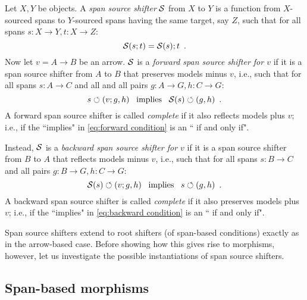 \begin{definition}
Let $X,Y$ be objects. A \emph{span source shifter} $\mathcal{S}$ from $X$ to $Y$ is a function from $X$-sourced spans to $Y$-sourced spans having the same target, say $Z$, such that for all spans $s:X\to Y,t:X\to Z$:
%
\begin{equation}\eqlabel{span shifters are functors}
\cS(s;t) = \cS(s);t \enspace.
\end{equation}
%
Now let $v=A\to B$ be an arrow. $\mathcal{S}$ is a \emph{forward span source shifter for $v$} if it is a span source shifter from $A$ to $B$ that preserves models minus $v$, i.e., such that for all spans $s:A\to C$ and all and all pairs $g:A\to G,h:C \to G$:
%
\begin{equation}\eqlabel{sb-forward condition}
s\commutes (v;g,h) \enspace\text{ implies }\enspace \cS(s) \commutes (g,h) \enspace.
\end{equation}
%
A forward span source shifter is called \emph{complete} if it also reflects models plus $v$; i.e., if the ``implies" in \eqref{eq:forward condition} is an `` if and only if".

Instead, $\mathcal{S}$ is a \emph{backward span source shifter for $v$} if it is a span source shifter from $B$ to $A$ that reflects models minus $v$, i.e., such that for all spans $s:B\to C$ and all pairs $g:B\to G,h:C\to G$:
%
\begin{equation}\eqlabel{sb-backward condition}
\cS(s) \commutes (v;g,h) \enspace\text{ implies }\enspace s\commutes (g,h) \enspace.
\end{equation}
%
A backward span source shifter is called \emph{complete} if it also preserves models plus $v$; i.e., if the ``implies" in \eqref{eq:backward condition} is an `` if and only if".
\end{definition}
%
Span source shifters extend to root shifters (of span-based conditions) exactly as in the arrow-based case. Before showing how this gives rise to morphisms, however, let us investigate the possible instantiations of span source shifters.



\subsection{Span-based morphisms}

